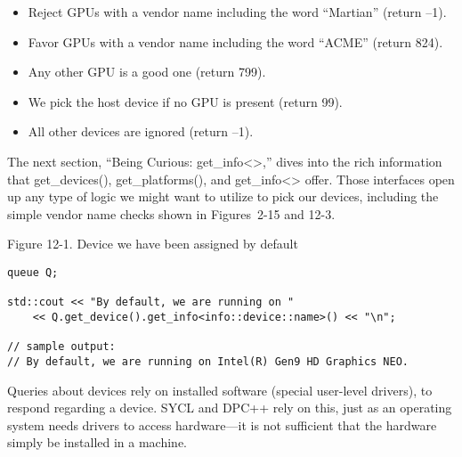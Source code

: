 \begin{itemize}
	\item Reject GPUs with a vendor name including the word “Martian” (return –1).
	\item Favor GPUs with a vendor name including the word “ACME” (return 824).
	\item Any other GPU is a good one (return 799).
	\item We pick the host device if no GPU is present (return 99).
	\item All other devices are ignored (return –1).
\end{itemize}

The next section, “Being Curious: get\_info<>,” dives into the rich information that get\_devices(), get\_platforms(), and get\_info<> offer. Those interfaces open up any type of logic we might want to utilize to pick our devices, including the simple vendor name checks shown in Figures 2-15 and 12-3.\par

\hspace*{\fill} \par %
Figure 12-1. Device we have been assigned by default
\begin{lstlisting}[caption={}]
queue Q;

std::cout << "By default, we are running on "
	<< Q.get_device().get_info<info::device::name>() << "\n";

// sample output:
// By default, we are running on Intel(R) Gen9 HD Graphics NEO.
\end{lstlisting}

\begin{tcolorbox}[colback=red!5!white,colframe=red!75!black]
Queries about devices rely on installed software (special user-level drivers), to respond regarding a device. SYCL and DPC++ rely on this, just as an operating system needs drivers to access hardware—it is not sufficient that the hardware simply be installed in a machine.
\end{tcolorbox}


